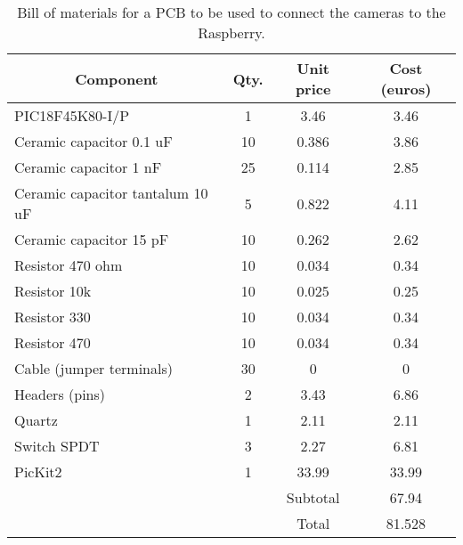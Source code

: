 \begin{table}
\begin{center}
\begin{tabular}{| l | c | c | c |}
\hline
\multicolumn{1}{|c|}{Component}	 & 	\multicolumn{1}{c|}{Qty.}	 & 	\multicolumn{1}{c|}{Unit price} & 	\multicolumn{1}{c|}{Cost (euros)}\\ \hline
PIC18F45K80-I/P	 & 	1	 & 	3.46	 & 	3.46\\ \hline
Ceramic capacitor 0.1 uF	 & 	10	 & 	0.386	 & 	3.86\\ \hline
Ceramic capacitor 1 nF	 & 	25	 & 	0.114	 & 	2.85\\ \hline
Ceramic capacitor tantalum 10 uF	 & 	5	 & 	0.822	 & 	4.11\\ \hline
Ceramic capacitor 15 pF	 & 	10	 & 	0.262	 & 	2.62\\ \hline
Resistor 470 ohm	 & 	10	 & 	0.034	 & 	0.34\\ \hline
Resistor 10k	 & 	10	 & 	0.025	 & 	0.25\\ \hline
Resistor 330	 & 	10	 & 	0.034	 & 	0.34\\ \hline
Resistor 470	 & 	10	 & 	0.034	 & 	0.34\\ \hline
Cable (jumper terminals)	 & 	30	 & 	0	 & 	0\\ \hline
Headers (pins)	 & 	2	 & 	3.43	 & 	6.86\\ \hline
Quartz	 & 	1	 & 	2.11	 & 	2.11\\ \hline
Switch SPDT	 & 	3	 & 	2.27	 & 	6.81\\ \hline
PicKit2	 & 	1	 & 	33.99	 & 	33.99\\ \hline
\multicolumn{2}{c|}{}	 & 	Subtotal	 & 	67.94\\ \cline{3-4}
\multicolumn{2}{c|}{}	& 	Total	 & 	81.528\\ \cline{3-4}
  \end{tabular}
\caption{Bill of materials for a PCB to be used to connect the cameras to the Raspberry.}
\label{tab_bompic}
\end{center}
\end{table}
